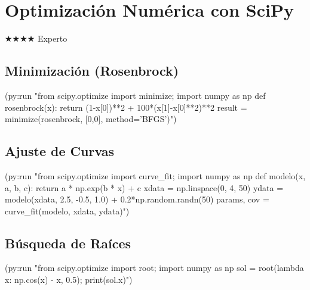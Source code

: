 \chapter{Optimización Numérica con SciPy}
\label{chap:optimization}
{\huge$\bigstar$}{\huge$\bigstar$}{\huge$\bigstar$}{\huge$\bigstar$} Experto

\section{Minimización (Rosenbrock)}
\begin{lispcode}
(py:run "from scipy.optimize import minimize; import numpy as np
def rosenbrock(x): return (1-x[0])**2 + 100*(x[1]-x[0]**2)**2
result = minimize(rosenbrock, [0,0], method='BFGS')")
\end{lispcode}

\section{Ajuste de Curvas}
\begin{lispcode}
(py:run "from scipy.optimize import curve_fit; import numpy as np
def modelo(x, a, b, c): return a * np.exp(b * x) + c
xdata = np.linspace(0, 4, 50)
ydata = modelo(xdata, 2.5, -0.5, 1.0) + 0.2*np.random.randn(50)
params, cov = curve_fit(modelo, xdata, ydata)")
\end{lispcode}

\section{Búsqueda de Raíces}
\begin{lispcode}
(py:run "from scipy.optimize import root; import numpy as np
sol = root(lambda x: np.cos(x) - x, 0.5); print(sol.x)")
\end{lispcode}

